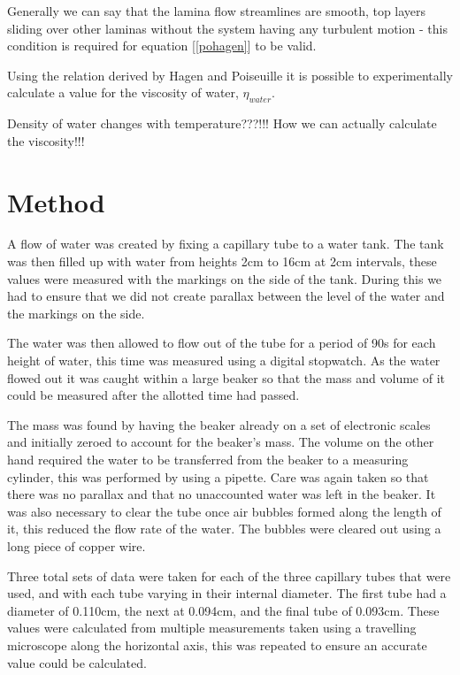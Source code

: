 \documentclass[twocolumn]{revtex4}
\begin{document}
Generally we can say that the lamina flow streamlines are smooth, top layers sliding over other laminas without the system having any turbulent motion - this condition is required for equation [\ref{pohagen}] to be valid. 

Using the relation derived by Hagen and Poiseuille it is possible to experimentally calculate a value for the viscosity of water, $\eta_{water}$.

Density of water changes with temperature???!!! How we can actually calculate the viscosity!!!

\vspace{-3ex}
\section{Method} 
\vspace{-2ex}
A flow of water was created by fixing a capillary tube to a water tank. The tank was then filled up with water from heights 2cm to 16cm at 2cm intervals, these values were measured with the markings on the side of the tank. During this we had to ensure that we did not create parallax between the level of the water and the markings on the side. 

The water was then allowed to flow out of the tube for a period of 90s for each height of water, this time was measured using a digital stopwatch. As the water flowed out it was caught within a large beaker so that the mass and volume of it could be measured after the allotted time had passed. 

The mass was found by having the beaker already on a set of electronic scales and initially zeroed to account for the beaker's mass. The volume on the other hand required the water to be transferred from the beaker to a measuring cylinder, this was performed by using a pipette. Care was again taken so that there was no parallax and that no unaccounted water was left in the beaker. It was also necessary to clear the tube once air bubbles formed along the length of it, this reduced the flow rate of the water. The bubbles were cleared out using a long piece of copper wire. 

Three total sets of data were taken for each of the three capillary tubes that were used, and with each tube varying in their internal diameter. The first tube had a diameter of 0.110cm, the next at 0.094cm, and the final tube of 0.093cm. These values were calculated from multiple measurements taken using a travelling microscope  along the horizontal axis, this was repeated to ensure an accurate value could be calculated. 
\end{document}
